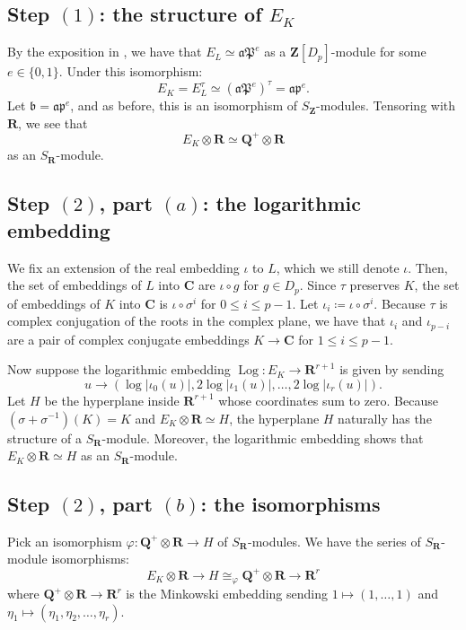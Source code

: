 \documentclass{amsart}
\newcommand{\QQ}{\mathbf{Q}}
\newcommand{\ZZ}{\mathbf{Z}}
\newcommand{\RR}{\mathbf{R}}
\newcommand{\CC}{\mathbf{C}}
\DeclareMathOperator{\Log}{Log}
\numberwithin{equation}{section}
\begin{document}
\subsection{Step $(1)$: the structure of $E_K$}
By the exposition in , we have that $E_L \simeq \mathfrak{a}\mathfrak{P}^{e}$ as a $\ZZ[D_p]$-module for some $e \in \{0,1\}$. Under this isomorphism:
\[
    E_K = E_L^{\tau} \simeq (\mathfrak{a}\mathfrak{P}^{e})^{\tau} = \mathfrak{a}\mathfrak{p}^{e}.
\]
Let $\mathfrak{b} = \mathfrak{a}\mathfrak{p}^{e}$, and as before, this is an isomorphism of $S_{\ZZ}$-modules. Tensoring with $\RR$, we see that
\[
    E_K \otimes \RR \simeq \QQ^+ \otimes \RR
\]
as an $S_\RR$-module. 

\subsection{Step $(2)$, part $(a)$: the logarithmic embedding}
We fix an extension of the real embedding $\iota$ to $L$, which we still denote $\iota$. Then, the set of embeddings of $L$ into $\CC$ are $\iota\circ g$ for $g\in D_p$. Since $\tau$ preserves $K$, the set of embeddings of $K$ into $\CC$ is $\iota\circ\sigma^i$ for $0\leq i\leq p-1$. Let $\iota_i\coloneqq\iota\circ\sigma^i$. Because $\tau$ is complex conjugation of the roots in the complex plane, we have that $\iota_i$ and $\iota_{p-i}$ are a pair of complex conjugate embeddings $K\rightarrow\CC$ for $1\leq i\leq p-1$.

Now suppose the logarithmic embedding $\Log \colon E_K \rightarrow \RR^{r+1}$ is given by sending 
\[
    u \rightarrow (\log |\iota_0(u)|, 2\log |\iota_1(u)|, \ldots, 2 \log |\iota_{r}(u)|).
\]
Let $H$ be the hyperplane inside $\RR^{r+1}$ whose coordinates sum to zero. Because $(\sigma + \sigma^{-1})(K) = K$ and $E_K \otimes \RR \simeq H$, the hyperplane $H$ naturally has the structure of a $S_{\RR}$-module. Moreover, the logarithmic embedding shows that $E_K \otimes \RR \simeq H$ as an $S_{\RR}$-module.

\subsection{Step $(2)$, part $(b)$: the isomorphisms}
Pick an isomorphism $\varphi \colon \QQ^+ \otimes \RR \rightarrow H$ of $S_{\RR}$-modules. We have the series of $S_{\RR}$-module isomorphisms:
\[
    E_K \otimes \RR \rightarrow H \cong_{\varphi} \QQ^+ \otimes \RR \rightarrow \RR^{r}
\]
where $\QQ^+ \otimes \RR \rightarrow \RR^r$ is the Minkowski embedding sending $1 \mapsto (1,\ldots,1)$ and $\eta_1 \mapsto (\eta_1,\eta_2,\dots,\eta_{r})$. 
\end{document}
